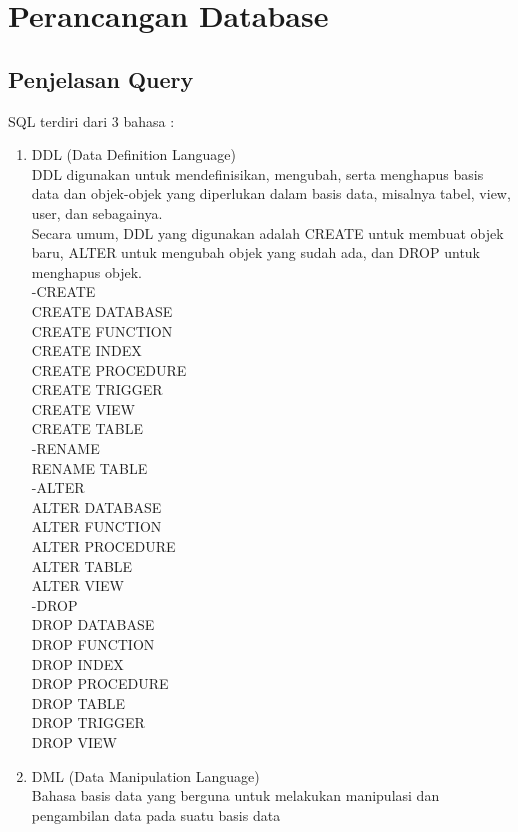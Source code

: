 \chapter{Perancangan Database}

\section{Penjelasan Query}
SQL terdiri dari 3 bahasa :
\begin{enumerate}
\item DDL (Data Definition Language)\\
   DDL digunakan untuk mendefinisikan, mengubah, serta menghapus basis data dan objek-objek yang diperlukan dalam basis data, misalnya tabel, view, user, dan sebagainya.\\
   Secara umum, DDL yang digunakan adalah CREATE untuk membuat objek baru, ALTER untuk mengubah objek yang sudah ada, dan DROP untuk menghapus objek.\\

   -CREATE\\
      CREATE DATABASE\\
      CREATE FUNCTION\\
      CREATE INDEX\\
      CREATE PROCEDURE\\
      CREATE TRIGGER\\
      CREATE VIEW\\
      CREATE TABLE\\
   -RENAME\\
      RENAME TABLE\\
   -ALTER\\
      ALTER DATABASE\\
      ALTER FUNCTION\\
      ALTER PROCEDURE\\
      ALTER TABLE\\
      ALTER VIEW\\
   -DROP\\
      DROP DATABASE\\
      DROP FUNCTION\\
      DROP INDEX\\
      DROP PROCEDURE\\
      DROP TABLE\\
      DROP TRIGGER\\
      DROP VIEW\\
\item DML (Data Manipulation Language)\\
   Bahasa basis data yang berguna untuk melakukan manipulasi dan pengambilan data pada suatu basis data\\


\end{enumerate}
